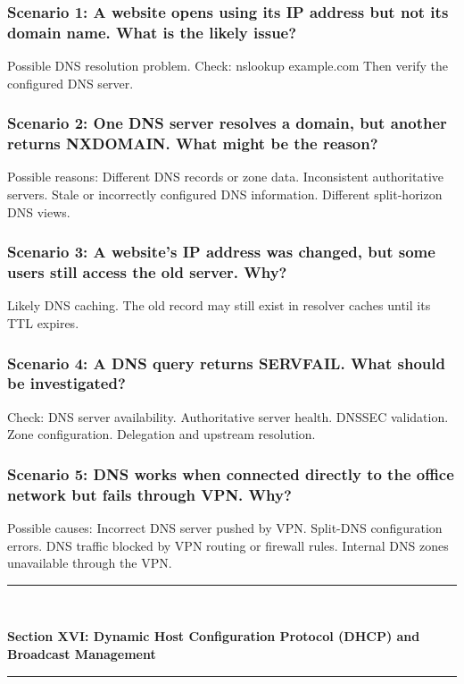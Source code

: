 \subsubsection*{Scenario 1: A website opens using its IP address but not its domain name. What is the likely issue?}
Possible DNS resolution problem.
Check:
nslookup example.com
Then verify the configured DNS server.
\subsubsection*{Scenario 2: One DNS server resolves a domain, but another returns NXDOMAIN. What might be the reason?}
Possible reasons:
Different DNS records or zone data.
Inconsistent authoritative servers.
Stale or incorrectly configured DNS information.
Different split-horizon DNS views.
\subsubsection*{Scenario 3: A website's IP address was changed, but some users still access the old server. Why?}
Likely DNS caching.
The old record may still exist in resolver caches until its TTL expires.
\subsubsection*{Scenario 4: A DNS query returns SERVFAIL. What should be investigated?}
Check:
DNS server availability.
Authoritative server health.
DNSSEC validation.
Zone configuration.
Delegation and upstream resolution.
\subsubsection*{Scenario 5: DNS works when connected directly to the office network but fails through VPN. Why?}
Possible causes:
Incorrect DNS server pushed by VPN.
Split-DNS configuration errors.
DNS traffic blocked by VPN routing or firewall rules.
Internal DNS zones unavailable through the VPN.

\newpage

\newpage
\begin{center}
\vspace{0.5em}
{\color{primary}\rule{0.45\textwidth}{1.2pt}\\[4pt]}
{\Large\bfseries\color{primary} Section XVI: Dynamic Host Configuration Protocol (DHCP) and Broadcast Management\\[2pt]}
{\color{primary}\rule{0.45\textwidth}{1.2pt}}
\vspace{0.5em}
\end{center}

